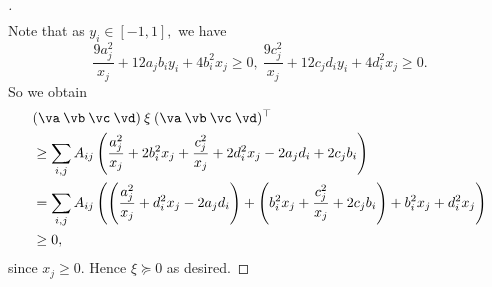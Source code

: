 \begin{proof} [\unskip\nopunct]
\begin{align*}
    \end{align*}
    Note that as $y_i \in [-1,1],$ we have
    \begin{equation*}
        \frac{9a_j^2}{x_j} + 12 a_j b_i y_i + 4 b_i^2x_j \geq 0,\: \frac{9c_j^2}{x_j} + 12 c_j d_i y_i + 4 d_i^2x_j \geq 0.
    \end{equation*}
    So we obtain
    \begin{align*}
        &(\va \: \vb \: \vc \: \vd) \: \xi \: (\va \: \vb \: \vc \: \vd)^\top \\
        &\geq \sum_{i,j} A_{ij} \left(\frac{a_j^2}{x_j} + 2 b_i^2x_j + \frac{c_j^2}{x_j} + 2 d_i^2x_j - 2a_j d_i + 2c_j b_i \right) \\
        &= \sum_{i,j} A_{ij} \left( \left(\frac{a_j^2}{x_j} + d_i^2x_j - 2a_j d_i \right) + \left(b_i^2x_j + \frac{c_j^2}{x_j} + 2c_j b_i\right) + b_i^2x_j + d_i^2x_j \right) \\
        &\geq 0,
    \end{align*}
    since $x_j \geq 0$. Hence $\xi \succeq 0$ as desired. 
\end{proof} 

